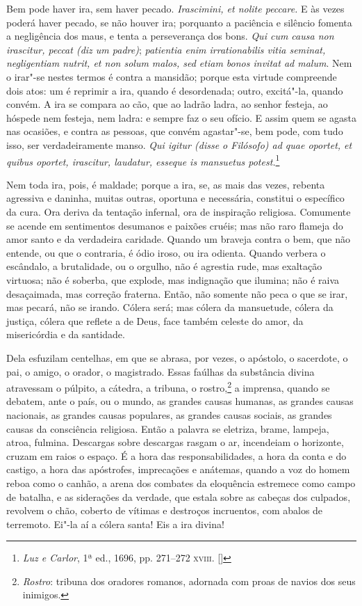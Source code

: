 \begin{hedraquote}
Bem pode haver ira, sem haver pecado. \textit{Irascimini,
et nolite peccare.} E às vezes poderá haver pecado, se não houver ira;
porquanto a paciência e silêncio fomenta a negligência dos maus, e
tenta a perseverança dos bons. \textit{Qui cum causa non irascitur,
peccat (diz um padre)};\textit{ patientia enim irrationabilis vitia
seminat, negligentiam nutrit, et non solum malos, sed etiam bonos
invitat ad malum}. Nem o irar"-se nestes termos é
contra a mansidão; porque esta virtude compreende dois atos: um é
reprimir a ira, quando é desordenada; outro, excitá"-la, quando convém.
A ira se compara ao cão, que ao ladrão ladra, ao senhor festeja, ao
hóspede nem festeja, nem ladra: e sempre faz o seu ofício. E assim quem
se agasta nas ocasiões, e contra as pessoas, que convém agastar"-se, bem
pode, com tudo isso, ser verdadeiramente manso. \textit{Qui igitur
(disse o Filósofo) ad quae oportet, et quibus oportet, irascitur,
laudatur, esseque is mansuetus potest.}\footnote{
\textit{Luz e Carlor}, 1ª ed., 1696, pp. 271--272 \textsc{xviii}. []}
\end{hedraquote}


Nem toda ira, pois, é maldade; porque a ira, se, as mais das
vezes, rebenta agressiva e daninha, muitas outras, oportuna e
necessária, constitui o específico da cura. Ora deriva da tentação
infernal, ora de inspiração religiosa. Comumente se acende em
sentimentos desumanos e paixões cruéis; mas não raro flameja do amor
santo e da verdadeira caridade. Quando um braveja contra o bem, que não
entende, ou que o contraria, é ódio iroso, ou ira odienta. Quando
verbera o escândalo, a brutalidade, ou o orgulho, não é agrestia rude,
mas exaltação virtuosa; não é soberba, que explode, mas indignação que
ilumina; não é raiva desaçaimada, mas correção fraterna. Então, não
somente não peca o que se irar, mas pecará, não se irando. Cólera será;
mas cólera da mansuetude, cólera da justiça, cólera que reflete a de
Deus, face também celeste do amor, da misericórdia e da santidade.

Dela esfuzilam centelhas, em que se abrasa, por vezes, o apóstolo,
o sacerdote, o pai, o amigo, o orador, o magistrado. Essas faúlhas da
substância divina atravessam o púlpito, a cátedra, a tribuna, o
rostro,\footnote{\textit{Rostro}: tribuna dos oradores romanos, adornada com proas de navios dos seus inimigos.} a imprensa, quando se debatem, ante
o país, ou o mundo, as grandes causas humanas, as grandes causas
nacionais, as grandes causas populares, as grandes causas sociais, as
grandes causas da consciência religiosa. Então a palavra se eletriza,
brame, lampeja, atroa, fulmina. Descargas sobre descargas rasgam o ar,
incendeiam o horizonte, cruzam em raios o espaço. É a hora das
responsabilidades, a hora da conta e do castigo, a hora das apóstrofes,
imprecações e anátemas, quando a voz do homem reboa como o canhão, a
arena dos combates da eloquência estremece como campo de batalha, e as
siderações da verdade, que estala sobre as cabeças dos culpados,
revolvem o chão, coberto de vítimas e destroços incruentos, com abalos
de terremoto. Ei"-la aí a cólera santa! Eis a ira divina!

